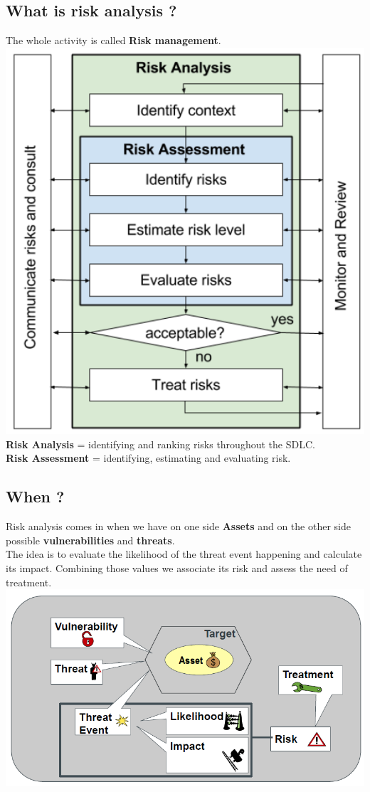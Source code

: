 \documentclass[10pt,a4paper,final]{report}
\begin{document}
\subsection{What is risk analysis ?}
The whole activity is called \textbf{Risk management}.\\
\includegraphics[scale=.55]{RiskManagment.png}\\
\textbf{Risk Analysis} = identifying and ranking risks throughout the SDLC. \\
\textbf{Risk Assessment} = identifying, estimating and evaluating risk.
\subsection{When ?}
Risk analysis comes in when we have on one side \textbf{Assets} and on the other side possible \textbf{vulnerabilities} and \textbf{threats}.\\
The idea is to evaluate the likelihood of the threat event happening and calculate its impact. Combining those values we associate its risk and assess the need of treatment.\\
\includegraphics[scale=.55]{RiskModel.png}
\end{document}
